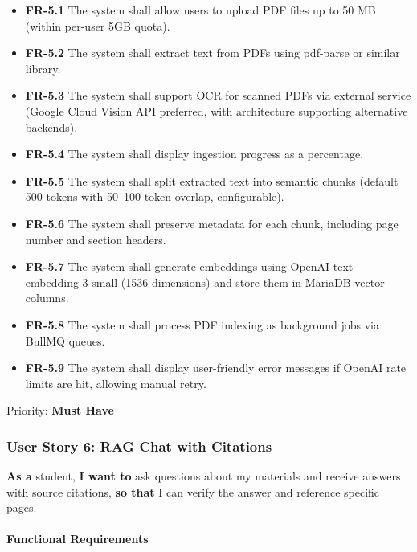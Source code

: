 \documentclass[12pt,a4paper]{article}
\begin{document}
\begin{itemize}
    \item \textbf{FR-5.1} The system shall allow users to upload PDF files up to 50 MB (within per-user 5GB quota).
    \item \textbf{FR-5.2} The system shall extract text from PDFs using pdf-parse or similar library.
    \item \textbf{FR-5.3} The system shall support OCR for scanned PDFs via external service (Google Cloud Vision API preferred, with architecture supporting alternative backends).
    \item \textbf{FR-5.4} The system shall display ingestion progress as a percentage.
    \item \textbf{FR-5.5} The system shall split extracted text into semantic chunks (default 500 tokens with 50--100 token overlap, configurable).
    \item \textbf{FR-5.6} The system shall preserve metadata for each chunk, including page number and section headers.
    \item \textbf{FR-5.7} The system shall generate embeddings using OpenAI text-embedding-3-small (1536 dimensions) and store them in MariaDB vector columns.
    \item \textbf{FR-5.8} The system shall process PDF indexing as background jobs via BullMQ queues.
    \item \textbf{FR-5.9} The system shall display user-friendly error messages if OpenAI rate limits are hit, allowing manual retry.
\end{itemize}

Priority: \textbf{Must Have}

\subsubsection{User Story 6: RAG Chat with Citations}

\textbf{As a} student, \textbf{I want to} ask questions about my materials and receive answers with source citations, \textbf{so that} I can verify the answer and reference specific pages.

\paragraph{Functional Requirements}
\end{document}
